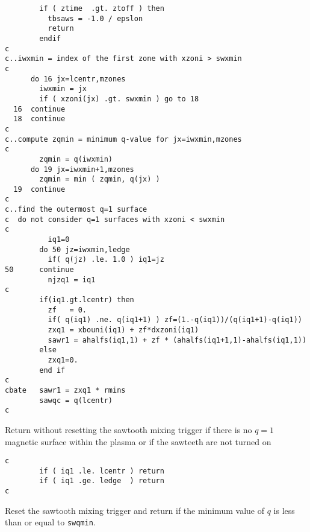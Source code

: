 \begin{verbatim}
        if ( ztime  .gt. ztoff ) then
          tbsaws = -1.0 / epslon
          return
        endif
c
c..iwxmin = index of the first zone with xzoni > swxmin
c
      do 16 jx=lcentr,mzones
        iwxmin = jx
        if ( xzoni(jx) .gt. swxmin ) go to 18
  16  continue
  18  continue
c
c..compute zqmin = minimum q-value for jx=iwxmin,mzones
c
        zqmin = q(iwxmin)
      do 19 jx=iwxmin+1,mzones
        zqmin = min ( zqmin, q(jx) )
  19  continue
c
c..find the outermost q=1 surface
c  do not consider q=1 surfaces with xzoni < swxmin
c
          iq1=0
        do 50 jz=iwxmin,ledge
          if( q(jz) .le. 1.0 ) iq1=jz
50      continue
          njzq1 = iq1
c
        if(iq1.gt.lcentr) then
          zf   = 0.
          if( q(iq1) .ne. q(iq1+1) ) zf=(1.-q(iq1))/(q(iq1+1)-q(iq1))
          zxq1 = xbouni(iq1) + zf*dxzoni(iq1)
          sawr1 = ahalfs(iq1,1) + zf * (ahalfs(iq1+1,1)-ahalfs(iq1,1))
        else
          zxq1=0.
        end if
c
cbate   sawr1 = zxq1 * rmins
        sawqc = q(lcentr)
c
\end{verbatim}

Return without resetting the sawtooth mixing trigger if there is no
$q=1$ magnetic surface within the plasma or if the sawteeth are not
turned on

\begin{verbatim}
c
        if ( iq1 .le. lcentr ) return
        if ( iq1 .ge. ledge  ) return
c
\end{verbatim}

Reset the sawtooth mixing trigger and return if the minimum value of $q$
is less than or equal to {\tt swqmin}.

